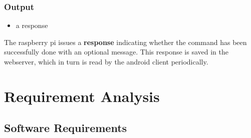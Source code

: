 \documentclass[12pt, oneside, a4paper]{book}
\begin{document}
				\subsubsection{Output}
				\begin{itemize}
					\item a response
				\end{itemize}
				The raspberry pi issues a \textbf{response} indicating whether the command has been successfully done with an optional message. This response is saved in the webserver, which in turn is read by the android client periodically.  
			
		\newpage\section{Requirement Analysis}
			\subsection{Software Requirements}
\end{document}
